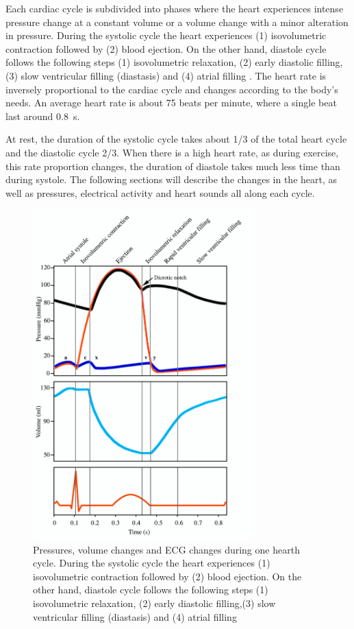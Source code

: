 Each cardiac cycle is subdivided into phases where the heart experiences intense pressure change at a constant volume or a volume change with a minor alteration in pressure. During the systolic cycle the heart experiences (1) isovolumetric contraction followed by (2) blood ejection. On the other hand, diastole cycle follows the following steps (1) isovolumetric relaxation, (2) early diastolic filling,(3) slow ventricular filling (diastasis) and (4) atrial filling \cite{fukuta2008cardiac}. The heart rate is inversely proportional to the cardiac cycle and changes according to the body's needs. An average heart rate is about 75 beats per minute, where a single beat last around \SI{0.8}{\second}.

At rest, the duration of the systolic cycle takes about 1/3 of the total heart cycle and the diastolic cycle 2/3. When there is a high heart rate, as during exercise, this rate proportion changes, the duration of diastole takes much less time than during systole. The following sections will describe the changes in the heart, as well as pressures, electrical activity and heart sounds all along each cycle.

\begin{figure}[!htpb]
	\centering
	\includegraphics[width=8.5cm,keepaspectratio]{figure_pressure}    
	\caption[Changes of Pressure and Volume in the heart - ECG]{Pressures, volume changes and ECG changes during one hearth cycle. During the systolic cycle the heart experiences (1) isovolumetric contraction followed by (2) blood ejection. On the other hand, diastole cycle follows the following steps (1) isovolumetric relaxation, (2) early diastolic filling,(3) slow ventricular filling (diastasis) and (4) atrial filling \cite{fukuta2008cardiac}}
	\label{fig:heart cycle}
\end{figure}

